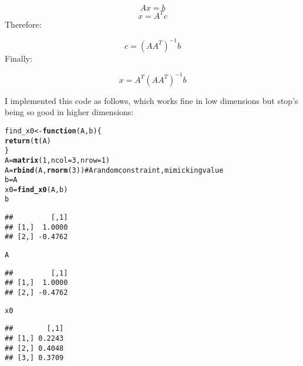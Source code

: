 \documentclass{article}\usepackage{graphicx, color}
\makeatletter
\newcommand{\hlfunctioncall}[1]{\textcolor[rgb]{0.501960784313725,0,0.329411764705882}{\textbf{#1}}}%
\newcommand{\hlcomment}[1]{\textcolor[rgb]{0.180392156862745,0.6,0.341176470588235}{#1}}%
\newenvironment{kframe}{%
 \def\at@end@of@kframe{}%
 \ifinner\ifhmode%
  \def\at@end@of@kframe{\end{minipage}}%
  \begin{minipage}{\columnwidth}%
 \fi\fi%
 \def\FrameCommand##1{\hskip\@totalleftmargin \hskip-\fboxsep
 \colorbox{shadecolor}{##1}\hskip-\fboxsep
     \hskip-\linewidth \hskip-\@totalleftmargin \hskip\columnwidth}%
 \MakeFramed {\advance\hsize-\width
   \@totalleftmargin\z@ \linewidth\hsize
   \@setminipage}}%
 {\par\unskip\endMakeFramed%
 \at@end@of@kframe}
\newenvironment{knitrout}{}{} %
\makeatother
\begin{document}
$$ A x = b$$
$$ x = A^Tc$$
Therefore:

$$ c = (AA^T)^{-1}b $$
Finally:

$$ x = A^T(AA^T)^{-1}b$$

\noindent
I implemented this code as follows, which works fine in low dimensions
but stop's being so good in higher dimensions:

\begin{knitrout}
\color{fgcolor}\begin{kframe}
\begin{alltt}
find_x0 <- \hlfunctioncall{function}(A, b) \{
    \hlfunctioncall{return}(\hlfunctioncall{t}(A) %*% \hlfunctioncall{solve}(A %*% \hlfunctioncall{t}(A)) %*% b)
\}
A = \hlfunctioncall{matrix}(1, ncol = 3, nrow = 1)
A = \hlfunctioncall{rbind}(A, \hlfunctioncall{rnorm}(3))  \hlcomment{# A random constraint, mimicking value}
b = A %*% \hlfunctioncall{c}(0.2, 0.3, 0.5)
x0 = \hlfunctioncall{find_x0}(A, b)
b
\end{alltt}
\begin{verbatim}
##         [,1]
## [1,]  1.0000
## [2,] -0.4762
\end{verbatim}
\begin{alltt}
A %*% x0
\end{alltt}
\begin{verbatim}
##         [,1]
## [1,]  1.0000
## [2,] -0.4762
\end{verbatim}
\begin{alltt}
x0
\end{alltt}
\begin{verbatim}
##        [,1]
## [1,] 0.2243
## [2,] 0.4048
## [3,] 0.3709
\end{verbatim}
\begin{alltt}


\end{alltt}
\end{kframe}
\end{knitrout}
\end{document}
